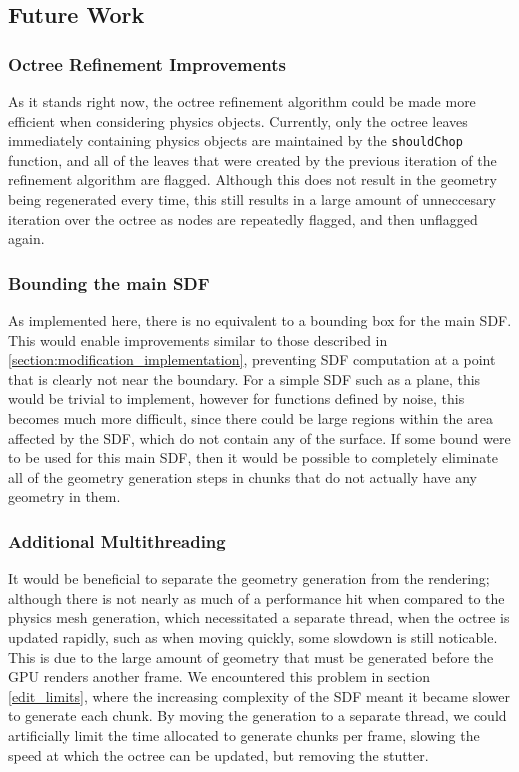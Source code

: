 \documentclass[11pt]{article}
\begin{document}
\subsection{Future Work}
\label{section:future_work}
\subsubsection{Octree Refinement Improvements}
As it stands right now, the octree refinement algorithm could be made more efficient when considering physics objects. Currently, only the octree leaves immediately containing physics objects are maintained by the \texttt{shouldChop} function, and all of the leaves that were created by the previous iteration of the refinement algorithm are flagged. Although this does not result in the geometry being regenerated every time, this still results in a large amount of unneccesary iteration over the octree as nodes are repeatedly flagged, and then unflagged again.
\subsubsection{Bounding the main SDF}
As implemented here, there is no equivalent to a bounding box for the main SDF. This would enable improvements similar to those described in \ref{section:modification_implementation}, preventing SDF computation at a point that is clearly not near the boundary. For a simple SDF such as a plane, this would be trivial to implement, however for functions defined by noise, this becomes much more difficult, since there could be large regions within the area affected by the SDF, which do not contain any of the surface. If some bound were to be used for this main SDF, then it would be possible to completely eliminate all of the geometry generation steps in chunks that do not actually have any geometry in them. 
\subsubsection{Additional Multithreading}
It would be beneficial to separate the geometry generation from the rendering; although there is not nearly as much of a performance hit when compared to the physics mesh generation, which necessitated a separate thread, when the octree is updated rapidly, such as when moving quickly, some slowdown is still noticable. This is due to the large amount of geometry that must be generated before the GPU renders another frame. We encountered this problem in section \ref{edit_limits}, where the increasing complexity of the SDF meant it became slower to generate each chunk. By moving the generation to a separate thread, we could artificially limit the time allocated to generate chunks per frame, slowing the speed at which the octree can be updated, but removing the stutter.
\end{document}
